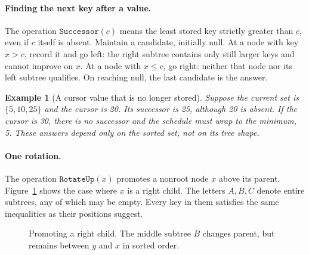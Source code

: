 \documentclass[11pt,a4paper]{article}
\theoremstyle{readable}
\newtheorem{example}[theorem]{Example}
\newcommand{\code}[1]{\texttt{#1}}
\begin{document}
\paragraph{Finding the next key after a value.}
The operation $\code{Successor}(c)$ means the least stored key strictly
greater than $c$, even if $c$ itself is absent. Maintain a candidate,
initially null. At a node with key $x>c$, record it and go left: the
right subtree contains only still larger keys and cannot improve on
$x$. At a node with $x\le c$, go right: neither that node nor its left
subtree qualifies. On reaching null, the last candidate is the answer.

\begin{example}[A cursor value that is no longer stored]
Suppose the current set is $\{5,10,25\}$ and the cursor is 20. Its
successor is 25, although 20 is absent. If the cursor is 30, there is
no successor and the schedule must wrap to the minimum, 5. These
answers depend only on the sorted set, not on its tree shape.
\end{example}

\paragraph{One rotation.}
The operation $\code{RotateUp}(x)$ promotes a nonroot node $x$ above
its parent. Figure~\ref{fig:rotation} shows the case where $x$ is a
right child. The letters $A,B,C$ denote entire subtrees, any of which
may be empty. Every key in them satisfies the same inequalities as
their positions suggest.

\begin{figure}[htbp]
\centering
{}
\caption{Promoting a right child. The middle subtree $B$ changes
parent, but remains between $y$ and $x$ in sorted order.}
\label{fig:rotation}
\end{figure}
\end{document}
